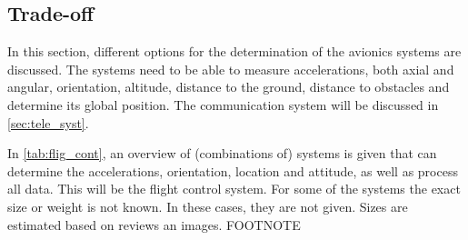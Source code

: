 \subsection{Trade-off}
\label{sec:avio_trad_off}
In this section, different options for the determination of the avionics systems are discussed. The systems need to be able to measure accelerations, both axial and angular, orientation, altitude, distance to the ground, distance to obstacles and determine its global position. The communication system will be discussed in \autoref{sec:tele_syst}.



In \autoref{tab:flig_cont}, an overview of (combinations of) systems is given that can determine the accelerations, orientation, location and attitude, as well as process all data. This will be the flight control system. For some of the systems the exact size or weight is not known. In these cases, they are not given. Sizes are estimated based on reviews an images. FOOTNOTE


